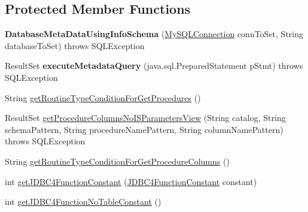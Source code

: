\subsection*{Protected Member Functions}
\begin{DoxyCompactItemize}
\item 
\mbox{\label{classcom_1_1mysql_1_1jdbc_1_1_database_meta_data_using_info_schema_a913f7305d6206445fc4fae7d4a8f4e33}} 
{\bfseries Database\+Meta\+Data\+Using\+Info\+Schema} (\mbox{\hyperlink{interfacecom_1_1mysql_1_1jdbc_1_1_my_s_q_l_connection}{My\+S\+Q\+L\+Connection}} conn\+To\+Set, String database\+To\+Set)  throws S\+Q\+L\+Exception 
\item 
\mbox{\label{classcom_1_1mysql_1_1jdbc_1_1_database_meta_data_using_info_schema_a293d76621d3f1ded136670a7b35cb279}} 
Result\+Set {\bfseries execute\+Metadata\+Query} (java.\+sql.\+Prepared\+Statement p\+Stmt)  throws S\+Q\+L\+Exception 
\item 
String \mbox{\hyperlink{classcom_1_1mysql_1_1jdbc_1_1_database_meta_data_using_info_schema_a78df26f7bd43db24e251d4b14560fe47}{get\+Routine\+Type\+Condition\+For\+Get\+Procedures}} ()
\item 
Result\+Set \mbox{\hyperlink{classcom_1_1mysql_1_1jdbc_1_1_database_meta_data_using_info_schema_a39f4d86800a2ecfb0e22a88485a92aae}{get\+Procedure\+Columns\+No\+I\+S\+Parameters\+View}} (String catalog, String schema\+Pattern, String procedure\+Name\+Pattern, String column\+Name\+Pattern)  throws S\+Q\+L\+Exception 
\item 
String \mbox{\hyperlink{classcom_1_1mysql_1_1jdbc_1_1_database_meta_data_using_info_schema_a0ccd2f846e79fd6ef8d5f77c6200fb03}{get\+Routine\+Type\+Condition\+For\+Get\+Procedure\+Columns}} ()
\item 
int \mbox{\hyperlink{classcom_1_1mysql_1_1jdbc_1_1_database_meta_data_using_info_schema_a7c25e43c46f40752d923944f2d6f9bcc}{get\+J\+D\+B\+C4\+Function\+Constant}} (\mbox{\hyperlink{enumcom_1_1mysql_1_1jdbc_1_1_database_meta_data_using_info_schema_1_1_j_d_b_c4_function_constant}{J\+D\+B\+C4\+Function\+Constant}} constant)
\item 
int \mbox{\hyperlink{classcom_1_1mysql_1_1jdbc_1_1_database_meta_data_using_info_schema_a29cf035125a66f19f874935b8cc8138a}{get\+J\+D\+B\+C4\+Function\+No\+Table\+Constant}} ()
\end{DoxyCompactItemize}
